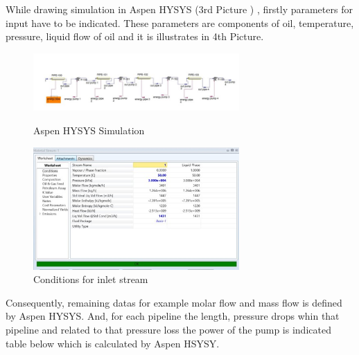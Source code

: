 \documentclass[12pt]{article}
\begin{document}
{\fontsize{12pt}{12pt}\selectfont 
While drawing simulation in Aspen HYSYS (3rd  Picture ) , firstly parameters for input have to be indicated. These parameters are components of oil, temperature, pressure, liquid flow of oil and it is illustrates in 4th Picture.
\\

}

\begin{figure}[h!]
	\centering
	\includegraphics[width=0.7\textwidth]{assets/images/some_pipe_stuff.jpg}
	\caption{Aspen HYSYS Simulation }

	\vspace{10mm}

	\includegraphics[width=0.7\textwidth]{assets/images/inlet.jpg}
	\caption{Conditions for inlet stream}
	\label{fig:your_image}
 \end{figure}
 

{\fontsize{12pt}{12pt}\selectfont
Consequently, remaining datas for example molar flow and mass flow is defined by Aspen HYSYS. And, for each pipeline the length, pressure drops whin that pipeline and related to that pressure loss the power of the pump is indicated table below which is calculated by Aspen HSYSY. 
\\


}
\end{document}
